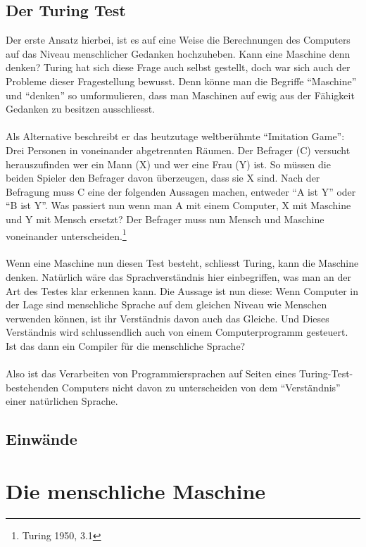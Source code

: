 \documentclass[a4paper,12pt]{article}
\begin{document}
\subsection{Der Turing Test}
Der erste Ansatz hierbei, ist es auf eine Weise die Berechnungen des Computers auf das Niveau menschlicher Gedanken hochzuheben. Kann eine Maschine denn denken? Turing hat sich diese Frage auch selbst gestellt, doch war sich auch der Probleme dieser Fragestellung bewusst. Denn könne man die Begriffe \enquote{Maschine} und \enquote{denken} so umformulieren, dass man Maschinen auf ewig aus der Fähigkeit Gedanken zu besitzen ausschliesst.\\
\\
Als Alternative beschreibt er das heutzutage weltberühmte \enquote{Imitation Game}:
Drei Personen in voneinander abgetrennten Räumen. Der Befrager (C) versucht herauszufinden wer ein Mann (X) und wer eine Frau (Y) ist. So müssen die beiden Spieler den Befrager davon überzeugen, dass sie X sind. Nach der Befragung muss C eine der folgenden Aussagen machen, entweder \enquote{A ist Y} oder \enquote{B ist Y}. Was passiert nun wenn man A mit einem Computer, X mit Maschine und Y mit Mensch ersetzt? Der Befrager muss nun Mensch und Maschine voneinander unterscheiden.\footnote{Turing 1950, 3.1} \\
\\
Wenn eine Maschine nun diesen Test besteht, schliesst Turing, kann die Maschine denken. Natürlich wäre das Sprachverständnis hier einbegriffen, was man an der Art des Testes klar erkennen kann. Die Aussage ist nun diese: Wenn Computer in der Lage sind menschliche Sprache auf dem gleichen Niveau wie Menschen verwenden können, ist ihr Verständnis davon auch das Gleiche. Und Dieses Verständnis wird schlussendlich auch von einem Computerprogramm gesteuert. Ist das dann ein Compiler für die menschliche Sprache? \\
\\
Also ist das Verarbeiten von Programmiersprachen auf Seiten eines Turing-Test-bestehenden Computers nicht davon zu unterscheiden von dem \enquote{Verständnis} einer natürlichen Sprache.

\subsection{Einwände}
\blindtext[1]


\section{Die menschliche Maschine}
\end{document}
